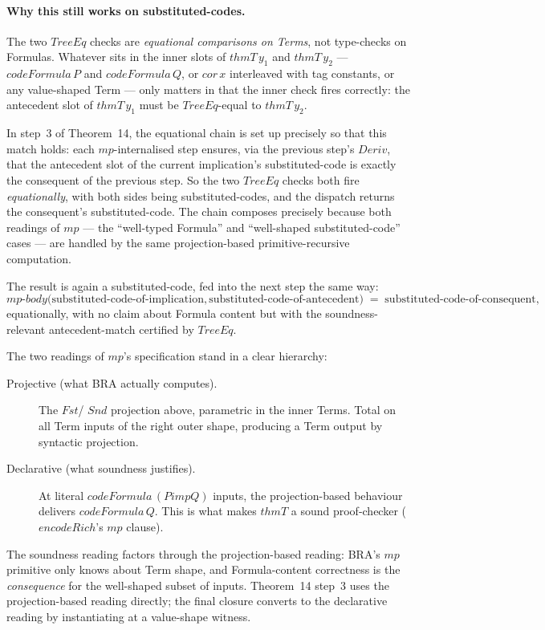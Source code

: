 \documentclass[11pt]{article}
\begin{document}
\paragraph{Why this still works on substituted-codes.}  The two
$\mathit{TreeEq}$ checks are \emph{equational comparisons on Terms},
not type-checks on Formulas.  Whatever sits in the inner slots of
$\mathit{thmT}\,y_1$ and $\mathit{thmT}\,y_2$ --- $\mathit{codeFormula}\,P$
and $\mathit{codeFormula}\,Q$, or $\mathit{cor}\,x$ interleaved with
tag constants, or any value-shaped Term --- only matters in that
the inner check fires correctly: the antecedent slot of
$\mathit{thmT}\,y_1$ must be $\mathit{TreeEq}$-equal to
$\mathit{thmT}\,y_2$.

In step~3 of Theorem~14, the equational chain is set up precisely so
that this match holds: each $\mathit{mp}$-internalised step ensures,
via the previous step's $\mathit{Deriv}$, that the antecedent slot of
the current implication's substituted-code is exactly the consequent
of the previous step.  So the two $\mathit{TreeEq}$ checks both fire
\emph{equationally}, with both sides being substituted-codes, and
the dispatch returns the consequent's substituted-code.  The chain
composes precisely because both readings of $\mathit{mp}$ --- the
``well-typed Formula'' and ``well-shaped substituted-code'' cases ---
are handled by the same projection-based primitive-recursive computation.

The result is again a substituted-code, fed into the next step the
same way:
\[
  \mathit{mp\text{-}body}\big(\text{substituted-code-of-implication},
                              \text{substituted-code-of-antecedent}\big)
   \;=\; \text{substituted-code-of-consequent},
\]
equationally, with no claim about Formula content but with the
soundness-relevant antecedent-match certified by $\mathit{TreeEq}$.

The two readings of $\mathit{mp}$'s specification stand in a clear
hierarchy:
\begin{description}
  \item[Projective (what BRA actually computes).]  The $\mathit{Fst}$/
        $\mathit{Snd}$ projection above, parametric in the inner
        Terms.  Total on all Term inputs of the right outer shape,
        producing a Term output by syntactic projection.
  \item[Declarative (what soundness justifies).]  At literal
        $\mathit{codeFormula}\,(P \mathrel{\mathit{imp}} Q)$ inputs, the
        projection-based behaviour delivers $\mathit{codeFormula}\,Q$.  This
        is what makes $\mathit{thmT}$ a sound proof-checker
        ($\mathit{encodeRich}$'s $\mathit{mp}$ clause).
\end{description}
The soundness reading factors through the projection-based reading: BRA's
$\mathit{mp}$ primitive only knows about Term shape, and Formula-content
correctness is the \emph{consequence} for the well-shaped subset of
inputs.  Theorem~14 step~3 uses the projection-based reading directly; the
final closure converts to the declarative reading by instantiating at
a value-shape witness.
\end{document}
